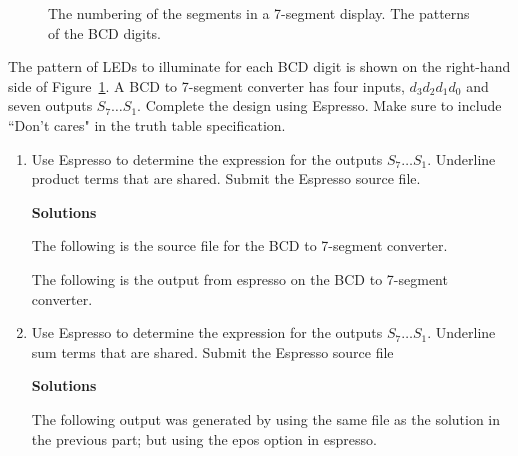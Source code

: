 \begin{enumerate}
\begin{figure}[ht]
\caption{The numbering of the segments in a 7-segment display.
The patterns of the BCD digits.}
\label{fig:BCD}
\end{figure}

The pattern of LEDs to illuminate for each BCD digit is shown on the 
right-hand side of Figure~\ref{fig:BCD}.  A BCD to 7-segment converter 
has four inputs, $d_3 d_2 d_1 d_0$ and seven outputs $S_7 \ldots S_1$.  
Complete the design using Espresso.  Make sure to include ``Don't cares" 
in the truth table specification. 
\begin{enumerate}
	\item Use Espresso to determine the \SOPmin expression for the outputs 
	$S_7 \ldots S_1$.  Underline product terms that are shared.
	Submit the Espresso source file.

\begin{onlysolution} \textbf{Solutions} \itshape{
The following is the source file for the BCD to 7-segment converter.


The following is the output from espresso on the 
BCD to 7-segment converter.

} \end{onlysolution} 

	\item Use Espresso to determine the \POSmin expression for the outputs 
	$S_7 \ldots S_1$.  Underline sum terms that are shared.
	Submit the Espresso source file
\begin{onlysolution} \textbf{Solutions} \itshape {
The following output was generated by using the same file
as the solution in the previous part; but using the epos
option in espresso.

}
\end{onlysolution}
\end{enumerate}
\end{enumerate}
